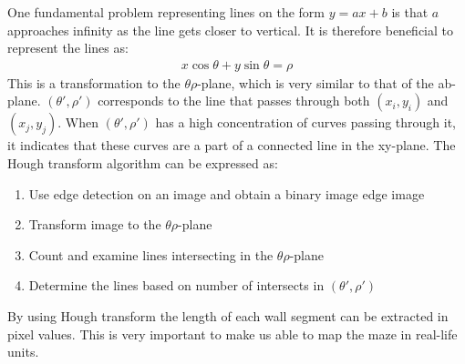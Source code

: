 One fundamental problem representing lines on the form $y = ax + b$ is that $a$ approaches infinity as the line gets closer to vertical. It is therefore beneficial to represent the lines as:
\begin{align*}
x\cos{\theta} + y\sin{\theta} = \rho
\end{align*}
This is a transformation to the $\theta\rho$-plane, which is very similar to that of the ab-plane. $(\theta',\rho')$ corresponds to the line that passes through both $(x_i,y_i)$ and $(x_j,y_j)$. When $(\theta',\rho')$ has a high concentration of curves passing through it, it indicates that these curves are a part of a connected line in the xy-plane. The Hough transform algorithm can be expressed as\cite{g}:
\begin{enumerate}
\item Use edge detection on an image and obtain a binary image edge image
\item Transform image to the $\theta\rho$-plane
\item Count and examine lines intersecting in the $\theta\rho$-plane
\item Determine the lines based on number of intersects in $(\theta',\rho')$
\end{enumerate}
By using Hough transform the length of each wall segment can be extracted in pixel values. This is very important to make us able to map the maze in real-life units.

